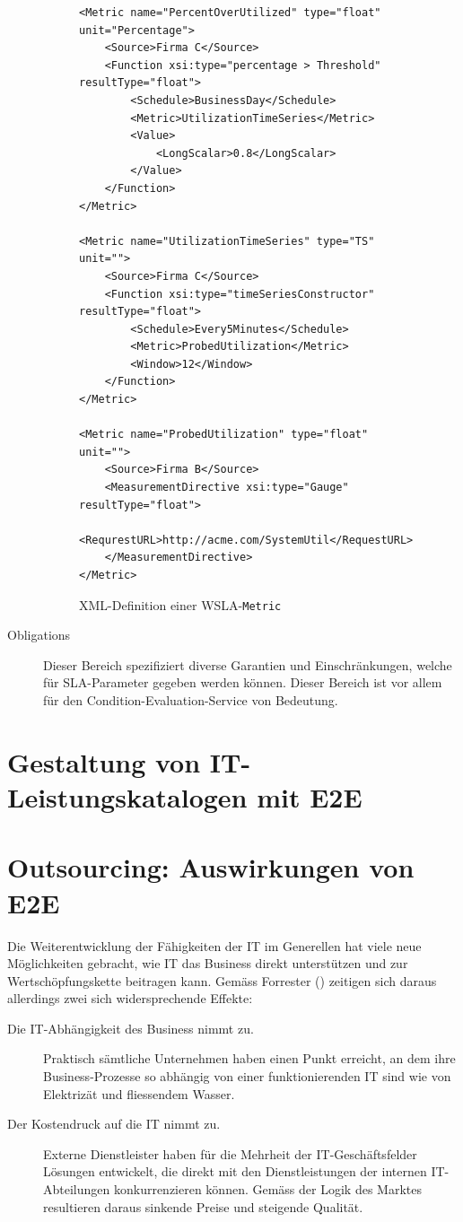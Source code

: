 \documentclass[11pt,listof=totoc]{scrreprt} %
\theoremstyle{definition}
\begin{document}
\begin{description}
\begin{figure}
\caption{XML-Definition einer WSLA-{\tt Metric}}
\label{wslametricxml}
\begin{lstlisting}
<Metric name="PercentOverUtilized" type="float" unit="Percentage">
	<Source>Firma C</Source>
	<Function xsi:type="percentage > Threshold" resultType="float">
		<Schedule>BusinessDay</Schedule>
		<Metric>UtilizationTimeSeries</Metric>
		<Value>
			<LongScalar>0.8</LongScalar>
		</Value>
	</Function>
</Metric>

<Metric name="UtilizationTimeSeries" type="TS" unit="">
	<Source>Firma C</Source>
	<Function xsi:type="timeSeriesConstructor" resultType="float">
		<Schedule>Every5Minutes</Schedule>
		<Metric>ProbedUtilization</Metric>
		<Window>12</Window>
	</Function>
</Metric>

<Metric name="ProbedUtilization" type="float" unit="">
	<Source>Firma B</Source>
	<MeasurementDirective xsi:type="Gauge" resultType="float">
		<RequrestURL>http://acme.com/SystemUtil</RequestURL>
	</MeasurementDirective>
</Metric>
\end{lstlisting}
\end{figure}

\item[Obligations] Dieser Bereich spezifiziert diverse Garantien und Einschränkungen, welche für SLA-Parameter gegeben werden können. Dieser Bereich ist vor allem für den Condition-Evaluation-Service von Bedeutung.
\end{description}

\section{Gestaltung von IT-Leistungskatalogen mit E2E}

\section{Outsourcing: Auswirkungen von E2E}

Die Weiterentwicklung der Fähigkeiten der IT im Generellen hat viele neue Möglichkeiten gebracht, wie IT das Business direkt unterstützen und zur Wertschöpfungskette beitragen kann. Gemäss Forrester (\cite{forrester:slaBestPractices}) zeitigen sich daraus allerdings zwei sich widersprechende Effekte:

\begin{description}
\item[Die IT-Abhängigkeit des Business nimmt zu.] Praktisch sämtliche Unternehmen haben einen Punkt erreicht, an dem ihre Business-Prozesse so abhängig von einer funktionierenden IT sind wie von Elektrizät und fliessendem Wasser.
\item[Der Kostendruck auf die IT nimmt zu.] Externe Dienstleister haben für die Mehrheit der IT-Geschäftsfelder Lösungen entwickelt, die direkt mit den Dienstleistungen der internen IT-Abteilungen konkurrenzieren können. Gemäss der Logik des Marktes resultieren daraus sinkende Preise und steigende Qualität.
\end{description}
\end{document}
